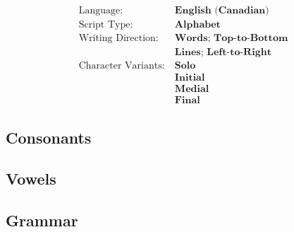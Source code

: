 \label{AlD}
\begin{align*}
\text{Language:}~           & \textbf{English (Canadian)}   \\
\text{Script Type:}~        & \textbf{Alphabet}             \\
\text{Writing Direction:}~  & \textbf{Words; Top-to-Bottom} \\
                            & \textbf{Lines; Left-to-Right} \\
\text{Character Variants:}~ & \textbf{Solo}                 \\
                            & \textbf{Initial}              \\
                            & \textbf{Medial}               \\
                            & \textbf{Final}%
\end{align*}

\newpage
\subsection{Consonants}

    
\newpage
\subsection{Vowels}

    
\newpage
\subsection{Grammar}
